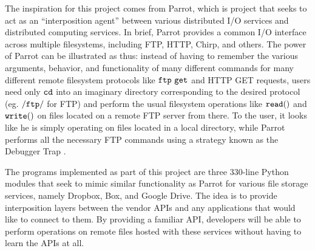 \documentclass[pageno]{jpaper}
\begin{document}
The inspiration for this project comes from Parrot, which is project that seeks to act as an ``interposition agent'' between various distributed I/O services and distributed computing services. In brief, Parrot provides a common I/O interface across multiple filesystems, including FTP, HTTP, Chirp, and others. The power of Parrot can be illustrated as thus: instead of having to remember the various arguments, behavior, and functionality of many different commands for many different remote filesystem protocols like $\tt{ftp \ get}$ and HTTP GET requests, users need only $\tt{cd}$ into an imaginary directory corresponding to the desired protocol (eg. $\tt{/ftp/}$ for FTP) and perform the usual filesystem operations like $\tt{read()}$ and $\tt{write()}$ on files located on a remote FTP server from there. To the user, it looks like he is simply operating on files located in a local directory, while Parrot performs all the necessary FTP commands using a strategy known as the Debugger Trap \cite{thain03}.

The programs implemented as part of this project are three 330-line Python modules that seek to mimic similar functionality as Parrot for various file storage services, namely Dropbox, Box, and Google Drive. The idea is to provide interposition layers between the vendor APIs and any applications that would like to connect to them. By providing a familiar API, developers will be able to perform operations on remote files hosted with these services without having to learn the APIs at all.
\end{document}
